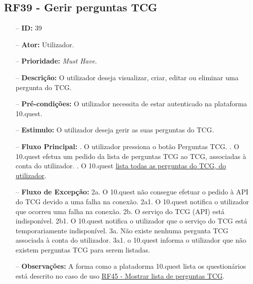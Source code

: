 \subsection{RF39 - Gerir perguntas TCG}
\begin{itemize}
	\item[--] \textbf{ID:} 39
	\item[--]  \textbf{Ator:} Utilizador.
	\item[--]  \textbf{Prioridade:} \textit{Must Have}.
	\item[--]  \textbf{Descrição:} O utilizador deseja visualizar, criar, editar ou eliminar uma pergunta do TCG.
	\item[--]  \textbf{Pré-condições:} O utilizador necessita de estar autenticado na plataforma 10.quest.
	\item[--]  \textbf{Estimulo:} O utilizador deseja gerir as suas perguntas do TCG.
	\item[--]  \textbf{Fluxo Principal:} 
	. O utilizador pressiona o botão Perguntas TCG.
	. O 10.quest efetua um pedido da lista de perguntas TCG ao TCG, associadas à conta do utilizador.
	. O 10.quest  \underline{lista todas as perguntas do TCG, do utilizador}.
	\item[--]  \textbf{Fluxo de Excepção:} 
	\subitem 2a. O 10.quest não consegue efetuar o pedido à API do TCG devido a uma falha na conexão.
	\subitem 2a1. O 10.quest notifica o utilizador que ocorreu uma falha na conexão.
	\subitem 2b. O serviço do TCG (API) está indisponível.
	\subitem 2b1. O 10.quest notifica o utilizador que o serviço do TCG está temporariamente indisponível. 
	\subitem 3a. Não existe nenhuma pergunta TCG associada à conta do utilizador.
	\subitem 3a1. o 10.quest informa o utilizador que não existem perguntas TCG para serem listadas.
	\item[--]  \textbf{Observações:} A forma como a platadorma 10.quest lista os questionários está descrito no caso de uso \underline{RF45 - Mostrar lista de perguntas TCG}.
\end{itemize}
\newpage

